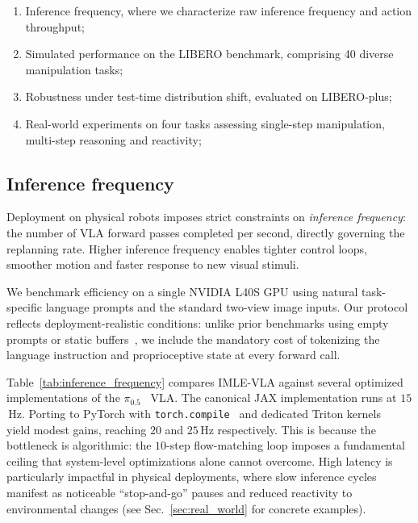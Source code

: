 \documentclass[letterpaper, 10 pt, conference]{ieeeconf}  %
\begin{document}
\begin{enumerate}[label=(\roman*)]
\item Inference frequency, where we characterize raw inference frequency and action throughput; 
\item Simulated performance on the LIBERO benchmark, comprising 40 diverse manipulation tasks; 
\item Robustness under test-time distribution shift, evaluated on LIBERO-plus;
\item Real-world experiments on four tasks assessing single-step manipulation, multi-step reasoning and reactivity;
\end{enumerate}

\subsection{Inference frequency}
\label{sec:inference_frequency}

Deployment on physical robots imposes strict constraints on \textit{inference frequency}: the number of VLA forward passes completed per second, directly governing the replanning rate. Higher inference frequency enables tighter control loops, smoother motion and faster response to new visual stimuli.

We benchmark efficiency on a single NVIDIA L40S GPU using natural task-specific language prompts and the standard two-view image inputs. Our protocol reflects deployment-realistic conditions: unlike prior benchmarks using empty prompts or static buffers~\cite{ma2025realtime}, we include the mandatory cost of tokenizing the language instruction and proprioceptive state at every forward call.

Table~\ref{tab:inference_frequency} compares IMLE-VLA against several optimized implementations of the $\pi_{0.5}$~\cite{black2025pi05} VLA. The canonical JAX implementation runs at $15$\,Hz. Porting to PyTorch with \texttt{torch.\allowbreak compile}~\cite{cadene2026lerobot} and dedicated Triton kernels~\cite{ma2025realtime} yield modest gains, reaching $20$ and $25$\,Hz respectively. This is because the bottleneck is algorithmic: the $10$-step flow-matching loop imposes a fundamental ceiling that system-level optimizations alone cannot overcome. High latency is particularly impactful in physical deployments, where slow inference cycles manifest as noticeable ``stop-and-go'' pauses and reduced reactivity to environmental changes (see Sec.~\ref{sec:real_world} for concrete examples).
\end{document}
